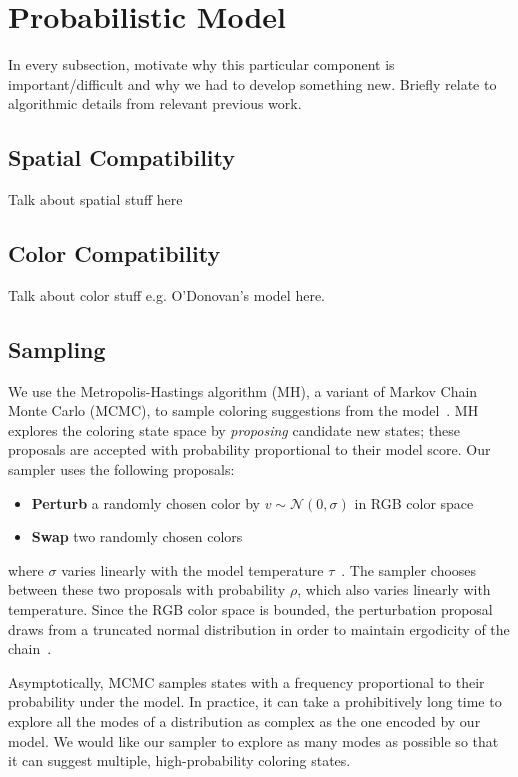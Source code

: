 \section{Probabilistic Model}
\label{sec:model}

In every subsection, motivate why this particular component is important/difficult and why we had to develop something new. Briefly relate to algorithmic details from relevant previous work.

\subsection{Spatial Compatibility}
\label{sec:spatialCompat}
Talk about spatial stuff here

\subsection{Color Compatibility}
\label{sec:colorCompat}
Talk about color stuff e.g. O'Donovan's model here.

\subsection{Sampling}
\label{sec:sampling}

We use the Metropolis-Hastings algorithm (MH), a variant of Markov Chain Monte Carlo (MCMC), to sample coloring suggestions from the model~\cite{Metropolis,Hastings}. MH explores the coloring state space by \emph{proposing} candidate new states; these proposals are accepted with probability proportional to their model score. Our sampler uses the following proposals:
\begin{itemize}
	\item{\textbf{Perturb} a randomly chosen color by $v \sim \mathcal{N}(0, \sigma)$ in RGB color space}
	\item{\textbf{Swap} two randomly chosen colors}
\end{itemize}
where $\sigma$ varies linearly with the model temperature $\tau$~. The sampler chooses between these two proposals with probability $\rho$, which also varies linearly with temperature. Since the RGB color space is bounded, the perturbation proposal draws from a truncated normal distribution in order to maintain ergodicity of the chain~\cite{TruncatedGaussians}.

Asymptotically, MCMC samples states with a frequency proportional to their probability under the model. In practice, it can take a prohibitively long time to explore all the modes of a distribution as complex as the one encoded by our model. We would like our sampler to explore as many modes as possible so that it can suggest multiple, high-probability coloring states.

